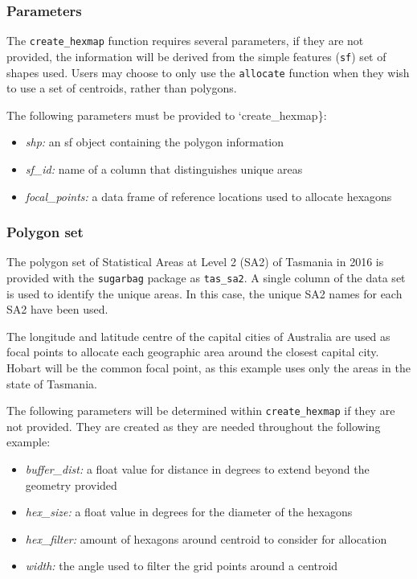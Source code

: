 \documentclass{monashthesis}
\begin{document}
\hypertarget{parameters}{%
\subsubsection{Parameters}\label{parameters}}

The \texttt{create\_hexmap} function requires several parameters, if they are not provided, the information will be derived from the simple features (\texttt{sf}) set of shapes used. Users may choose to only use the \texttt{allocate} function when they wish to use a set of centroids, rather than \autocite{sf} polygons.

The following parameters must be provided to `create\_hexmap\}:

\begin{itemize}
\tightlist
\item
  \emph{shp:} an sf object containing the polygon information
\item
  \emph{sf\_id:} name of a column that distinguishes unique areas
\item
  \emph{focal\_points:} a data frame of reference locations used to allocate hexagons
\end{itemize}

\hypertarget{polygon-set}{%
\subsubsection{Polygon set}\label{polygon-set}}

The polygon set of Statistical Areas at Level 2 (SA2) \autocite{abs2016} of Tasmania in 2016 is provided with the \texttt{sugarbag} package as \texttt{tas\_sa2}.
A single column of the data set is used to identify the unique areas.
In this case, the unique SA2 names for each SA2 have been used.

The longitude and latitude centre of the capital cities of Australia are used as focal points to allocate each geographic area around the closest capital city. Hobart will be the common focal point, as this example uses only the areas in the state of Tasmania.

The following parameters will be determined within \texttt{create\_hexmap} if they are not provided. They are created as they are needed throughout the following example:

\begin{itemize}
\tightlist
\item
  \emph{buffer\_dist:} a float value for distance in degrees to extend beyond the geometry provided
\item
  \emph{hex\_size:} a float value in degrees for the diameter of the hexagons
\item
  \emph{hex\_filter:} amount of hexagons around centroid to consider for allocation
\item
  \emph{width:} the angle used to filter the grid points around a centroid
\end{itemize}
\end{document}
